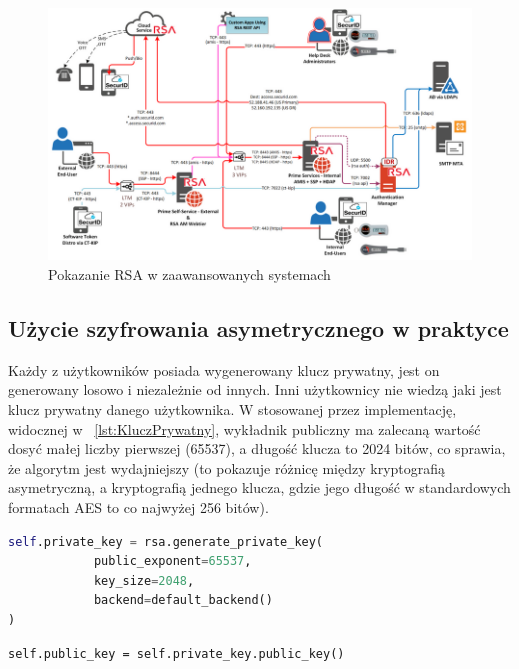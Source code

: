 \begin{figure}[H]
    \centering
    \includegraphics[width=\textwidth]{Images/RSASieci.png}
    \caption{Pokazanie RSA w zaawansowanych systemach}
    \label{fig:RSASieci}
\end{figure}

\subsection{Użycie szyfrowania asymetrycznego w praktyce}

Każdy z użytkowników posiada wygenerowany klucz prywatny, jest on generowany losowo i niezależnie od innych. Inni użytkownicy nie wiedzą jaki jest klucz prywatny danego użytkownika. W stosowanej przez implementację, widocznej w \lstlistingname{}~\ref{lst:KluczPrywatny}, wykładnik publiczny ma zalecaną wartość dosyć małej liczby pierwszej (65537), a długość klucza to 2024 bitów, co sprawia, że algorytm jest wydajniejszy (to pokazuje różnicę między kryptografią asymetryczną, a kryptografią jednego klucza, gdzie jego długość w standardowych formatach AES to co najwyżej 256 bitów).

\begin{minipage}{\linewidth}
\begin{lstlisting}[language=Python, extendedchars=true, caption={Generowanie klucza prywatnego}, label={lst:KluczPrywatny}]
self.private_key = rsa.generate_private_key(
            public_exponent=65537,
            key_size=2048,
            backend=default_backend()
)
\end{lstlisting}
\end{minipage}


\begin{lstlisting}
self.public_key = self.private_key.public_key()
\end{lstlisting}

